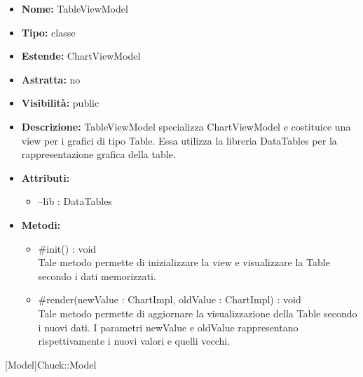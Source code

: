 			
			\begin{itemize}
			\item \textbf{Nome:} TableViewModel
			\item \textbf{Tipo:} classe
			
		\item \textbf{Estende:}
		ChartViewModel
		\item \textbf{Astratta:}
		no
			\item \textbf{Visibilità:} public
			\item \textbf{Descrizione:} TableViewModel specializza ChartViewModel e costituice una view per i grafici di tipo Table. Essa utilizza la libreria DataTables per la rappresentazione grafica della table.
			\item \textbf{Attributi:}
				\begin{itemize}
				\setlength{\itemsep}{5pt}
				
					\item[\ding{111}] {--lib : DataTables}
				\end{itemize}
		
			\item \textbf{Metodi:}
				\begin{itemize}
				\setlength{\itemsep}{5pt}
				
					\item[\ding{111}] {{\#init() : void}} \\ [1mm] Tale metodo permette di inizializzare la view e visualizzare la Table secondo i dati memorizzati.
					\item[\ding{111}] {{\#render(newValue : ChartImpl, oldValue : ChartImpl) : void}} \\ [1mm] Tale metodo permette di aggiornare la visualizzazione della Table secondo i nuovi dati. I parametri newValue e oldValue rappresentano rispettivamente i nuovi valori e quelli vecchi.
				\end{itemize}
		
			\end{itemize}

			
			[Model]{Chuck::Model}
			

	

